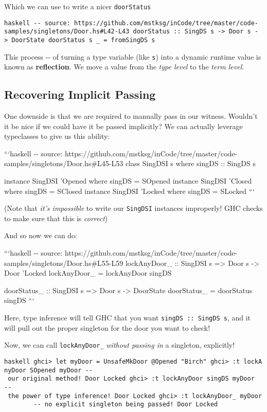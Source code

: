 \documentclass[]{article}
\begin{document}
Which we can use to write a nicer \texttt{doorStatus}

\texttt{haskell\ -\/-\ source:\ https://github.com/mstksg/inCode/tree/master/code-samples/singletons/Door.hs\#L42-L43\ doorStatus\ ::\ SingDS\ s\ -\textgreater{}\ Door\ s\ -\textgreater{}\ DoorState\ doorStatus\ s\ \_\ =\ fromSingDS\ s}

This process -\/- of turning a type variable (like \texttt{s}) into a dynamic
runtime value is known as \textbf{reflection}. We move a value from the
\emph{type level} to the \emph{term level}.

\subsection{Recovering Implicit Passing}

One downside is that we are required to manually pass in our witness. Wouldn't
it be nice if we could have it be passed implicitly? We can actually leverage
typeclasses to give us this ability:

```haskell -\/- source:
https://github.com/mstksg/inCode/tree/master/code-samples/singletons/Door.hs\#L45-L53
class SingDSI s where singDS :: SingDS s

instance SingDSI 'Opened where singDS = SOpened instance SingDSI 'Closed where
singDS = SClosed instance SingDSI 'Locked where singDS = SLocked ```

(Note that \emph{it's impossible} to write our \texttt{SingDSI} instances
improperly! GHC checks to make sure that this is \emph{correct})

And so now we can do:

```haskell -\/- source:
https://github.com/mstksg/inCode/tree/master/code-samples/singletons/Door.hs\#L55-L59
lockAnyDoor\_ :: SingDSI s =\textgreater{} Door s -\textgreater{} Door 'Locked
lockAnyDoor\_ = lockAnyDoor singDS

doorStatus\_ :: SingDSI s =\textgreater{} Door s -\textgreater{} DoorState
doorStatus\_ = doorStatus singDS ```

Here, type inference will tell GHC that you want \texttt{singDS\ ::\ SingDS\ s},
and it will pull out the proper singleton for the door you want to check!

Now, we can call \texttt{lockAnyDoor\_} \emph{without passing in} a singleton,
explicitly!

\texttt{haskell\ ghci\textgreater{}\ let\ myDoor\ =\ UnsafeMkDoor\ @\textquotesingle{}Opened\ "Birch"\ ghci\textgreater{}\ :t\ lockAnyDoor\ SOpened\ myDoor\ -\/-\ our\ original\ method!\ Door\ \textquotesingle{}Locked\ ghci\textgreater{}\ :t\ lockAnyDoor\ singDS\ myDoor\ \ -\/-\ the\ power\ of\ type\ inference!\ Door\ \textquotesingle{}Locked\ ghci\textgreater{}\ :t\ lockAnyDoor\_\ myDoor\ \ \ \ \ \ \ \ -\/-\ no\ explicit\ singleton\ being\ passed!\ Door\ \textquotesingle{}Locked}
\end{document}
